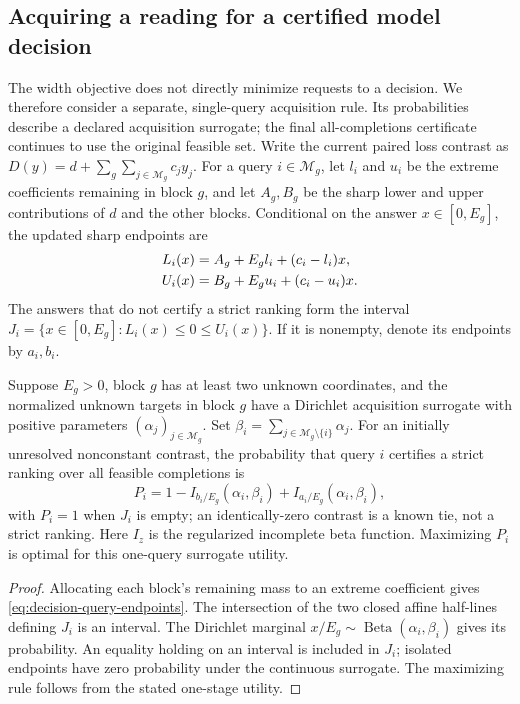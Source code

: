 \subsection{Acquiring a reading for a certified model decision}
\label{sec:decision-acquisition}
The width objective does not directly minimize requests to a decision.
We therefore consider a separate, single-query acquisition rule. Its
probabilities describe a declared acquisition surrogate; the final
all-completions certificate continues to use the original feasible set.
Write the current paired loss contrast as
$D(y)=d+\sum_g\sum_{j\in\mathcal M_g}c_jy_j$.
For a query $i\in\mathcal M_g$, let $l_i$ and $u_i$ be the extreme
coefficients remaining in block $g$, and let $A_g,B_g$ be the sharp
lower and upper contributions of $d$ and the other blocks. Conditional
on the answer $x\in[0,E_g]$, the updated sharp endpoints are
\begin{align}
 L_i(x)&=A_g+E_gl_i+(c_i-l_i)x,\notag\\
 U_i(x)&=B_g+E_gu_i+(c_i-u_i)x.\label{eq:decision-query-endpoints}
\end{align}
The answers that do not certify a strict ranking form the interval
$J_i=\{x\in[0,E_g]:L_i(x)\leq0\leq U_i(x)\}$.
If it is nonempty, denote its endpoints by $a_i,b_i$.

\begin{proposition}
\label{prop:decision-query-probability}
Suppose $E_g>0$, block $g$ has at least two unknown coordinates, and
the normalized unknown targets in block $g$ have a Dirichlet
acquisition surrogate with positive parameters $(\alpha_j)_{j\in\mathcal M_g}$.
Set $\beta_i=\sum_{j\in\mathcal M_g\setminus\{i\}}\alpha_j$.
For an initially unresolved nonconstant contrast, the probability
that query $i$ certifies a strict ranking over all feasible completions is
\begin{equation}
 P_i=1-I_{b_i/E_g}(\alpha_i,\beta_i)
       +I_{a_i/E_g}(\alpha_i,\beta_i),
 \label{eq:decision-query-probability}
\end{equation}
with $P_i=1$ when $J_i$ is empty; an identically-zero contrast is
a known tie, not a strict ranking. Here $I_z$ is the regularized incomplete
beta function. Maximizing $P_i$ is optimal for this one-query surrogate
utility.
\end{proposition}
\begin{proof}
Allocating each block's remaining mass to an extreme coefficient gives
\eqref{eq:decision-query-endpoints}. The intersection of the two closed affine
half-lines defining $J_i$ is an interval. The Dirichlet marginal
$x/E_g\sim\operatorname{Beta}(\alpha_i,\beta_i)$ gives its probability.
An equality holding on an interval is included in $J_i$; isolated
endpoints have zero probability under the continuous
surrogate. The maximizing rule follows from the stated one-stage utility.
\end{proof}

